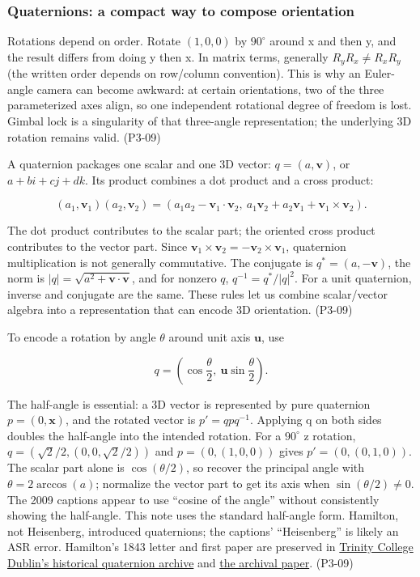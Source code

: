 \subsubsection{Quaternions: a compact way to compose orientation}\label{03-visual-computing-i-ch001-quaternions-a-compact-way-to-compose-orientation}

Rotations depend on order. Rotate \((1,0,0)\) by \(90^\circ\) around x and then y, and the result differs from doing y then x. In matrix terms, generally \(R_yR_x\ne R_xR_y\) (the written order depends on row/column convention). This is why an Euler-angle camera can become awkward: at certain orientations, two of the three parameterized axes align, so one independent rotational degree of freedom is lost. Gimbal lock is a singularity of that three-angle representation; the underlying 3D rotation remains valid. (P3-09)

A quaternion packages one scalar and one 3D vector: \(q=(a,\mathbf v)\), or \(a+bi+cj+dk\). Its product combines a dot product and a cross product:

\[
(a_1,\mathbf v_1)(a_2,\mathbf v_2)=
(a_1a_2-\mathbf v_1\cdot\mathbf v_2,\ a_1\mathbf v_2+a_2\mathbf v_1+\mathbf v_1\times\mathbf v_2).
\]

The dot product contributes to the scalar part; the oriented cross product contributes to the vector part. Since \(\mathbf v_1\times\mathbf v_2=-\mathbf v_2\times\mathbf v_1\), quaternion multiplication is not generally commutative. The conjugate is \(q^*=(a,-\mathbf v)\), the norm is \(|q|=\sqrt{a^2+\mathbf v\cdot\mathbf v}\), and for nonzero \(q\), \(q^{-1}=q^*/|q|^2\). For a unit quaternion, inverse and conjugate are the same. These rules let us combine scalar/vector algebra into a representation that can encode 3D orientation. (P3-09)

To encode a rotation by angle \(\theta\) around unit axis \(\mathbf u\), use

\[
q=\left(\cos\frac{\theta}{2},\ \mathbf u\sin\frac{\theta}{2}\right).
\]

The half-angle is essential: a 3D vector is represented by pure quaternion \(p=(0,\mathbf x)\), and the rotated vector is \(p'=q p q^{-1}\). Applying q on both sides doubles the half-angle into the intended rotation. For a \(90^\circ\) z rotation, \(q=(\sqrt2/2,(0,0,\sqrt2/2))\) and \(p=(0,(1,0,0))\) gives \(p'=(0,(0,1,0))\). The scalar part alone is \(\cos(\theta/2)\), so recover the principal angle with \(\theta=2\arccos(a)\); normalize the vector part to get its axis when \(\sin(\theta/2)\ne0\). The 2009 captions appear to use ``cosine of the angle'' without consistently showing the half-angle. This note uses the standard half-angle form. Hamilton, not Heisenberg, introduced quaternions; the captions' ``Heisenberg'' is likely an ASR error. Hamilton's 1843 letter and first paper are preserved in \href{https://www.maths.tcd.ie/pub/HistMath/People/Hamilton/QLetter/}{Trinity College Dublin's historical quaternion archive} and \href{https://www.maths.tcd.ie/pub/HistMath/People/Hamilton/Quatern1/}{the archival paper}. (P3-09)


